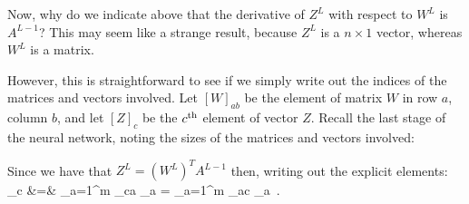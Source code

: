 \begin{examplebox}

Now, why do we indicate above that the derivative of $Z^L$ with
respect to $W^L$ is $A^{L-1}$?  This may seem like a strange result,
because $Z^L$ is a $n\times 1$ vector, whereas $W^L$ is a matrix.

However, this is straightforward to see if we simply write out the
indices of the matrices and vectors involved.  Let $[W]_{ab}$ be the
element of matrix $W$ in row $a$, column $b$, and let $[Z]_c$ be the
$c^{\rm th}$ element of vector $Z$.  Recall the last stage of the
neural network, noting the sizes of the matrices and vectors involved:

\hspace*{-20ex}

\noindent
Since we have that
$
	Z^L = (W^L)^T A^{L-1}
$
then, writing out the explicit elements:
\bea
	\left [Z^L \right]_c &=& \sum_{a=1}^m \left[ (W^L)^T \right]_{ca} \left[ A^{L-1} \right]_a
	 = \sum_{a=1}^m \left[ W^L \right]_{ac} \left[ A^{L-1} \right]_a
\,.
\eea


\end{examplebox}
